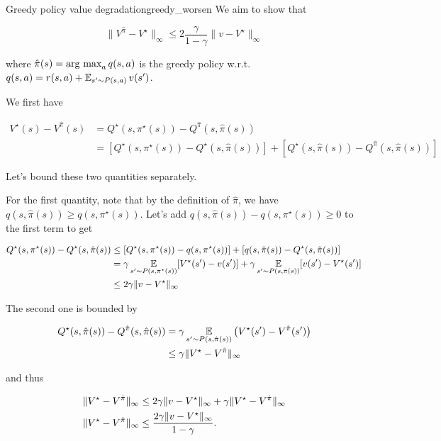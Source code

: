 \documentclass[../main/main]{subfiles}
\begin{document}
\begin{theorem}{Greedy policy value degradation}{greedy_worsen}
    We aim to show that

    \[
        \|V^{\hat \pi} - V^\star \|_{\infty} \le 2 \frac{\gamma}{1-\gamma} \|v - V^\star\|_{\infty}
    \]

    where $\hat \pi(s) = \operatorname*{\textrm{arg\ max}}_a q(s, a)$ is the greedy policy w.r.t. $q(s, a) = r(s, a) + \operatorname*{\mathbb{E}}_{s' \sim P(s, a)} v(s')$.

    We first have

    \begin{align*}
        V^{\star}(s) - V^{\hat \pi}(s) &= Q^{\star}(s,\pi^\star(s)) - Q^{\hat \pi}(s, \hat \pi(s))\\
        &= [Q^{\star}(s,\pi^\star(s)) - Q^{\star}(s, \hat \pi(s))] + [Q^{\star}(s, \hat \pi(s)) - Q^{\hat \pi}(s, \hat \pi(s))]
    \end{align*}

    Let's bound these two quantities separately.

    For the first quantity, note that by the definition of $\hat \pi$, we have $q(s, \hat \pi(s)) \ge q(s,\pi^\star(s))$. Let's add $q(s, \hat \pi(s)) - q(s,\pi^\star(s)) \ge 0$ to the first term to get

    \begin{align*}
        Q^{\star}(s,\pi^\star(s)) - Q^{\star}(s, \hat \pi(s)) &\le [Q^{\star}(s,\pi^\star(s))- q(s,\pi^\star(s))] + [q(s, \hat \pi(s)) - Q^{\star}(s, \hat \pi(s))] \\
        &= \gamma \operatorname*{\mathbb{E}}_{s' \sim P(s, \pi^{\star}(s))} [ V^{\star}(s') - v(s') ] + \gamma \operatorname*{\mathbb{E}}_{s' \sim P(s, \hat \pi(s))} [ v(s') - V^{\star}(s') ] \\
        &\le 2 \gamma \|v - V^{\star}\|_{\infty}
    \end{align*}

    The second one is bounded by

    \begin{align*}
        Q^{\star}(s, \hat \pi(s)) - Q^{\hat \pi}(s, \hat \pi(s))
        &=
        \gamma \operatorname*{\mathbb{E}}_{s'\sim P(s, \hat \pi(s))}\left( V^\star(s') - V^{\hat \pi}(s') \right)\\
        & \leq 
        \gamma \|V^{\star} - V^{\hat \pi}\|_\infty
    \end{align*}

    and thus

    \begin{align*}
        \|V^\star - V^{\hat \pi}\|_\infty &\le 2 \gamma \|v - V^{\star}\|_{\infty} + \gamma \|V^{\star} - V^{\hat \pi}\|_\infty \\
        \|V^\star - V^{\hat \pi}\|_\infty &\le {2 \gamma \|v - V^{\star}\|_{\infty} \over 1-\gamma}.
    \end{align*}
\end{theorem}
\end{document}
